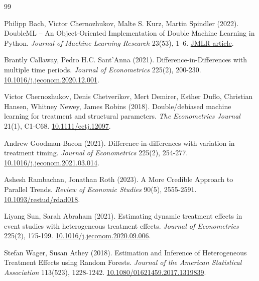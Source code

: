 \begin{thebibliography}{99}

 Philipp Bach, Victor Chernozhukov, Malte S. Kurz, Martin Spindler (2022). DoubleML – An Object-Oriented Implementation of Double Machine Learning in Python. \textit{Journal of Machine Learning Research} 23(53), 1–6. \href{https://jmlr.org/papers/v23/21-0862.html}{JMLR article}.

 Brantly Callaway, Pedro H.C. Sant’Anna (2021). Difference-in-Differences with multiple time periods. \textit{Journal of Econometrics} 225(2), 200-230. \href{https://doi.org/10.1016/j.jeconom.2020.12.001}{10.1016/j.jeconom.2020.12.001}.

 Victor Chernozhukov, Denis Chetverikov, Mert Demirer, Esther Duflo, Christian Hansen, Whitney Newey, James Robins (2018). Double/debiased machine learning for treatment and structural parameters. \textit{The Econometrics Journal} 21(1), C1-C68. \href{https://doi.org/10.1111/ectj.12097}{10.1111/ectj.12097}.

 Andrew Goodman-Bacon (2021). Difference-in-differences with variation in treatment timing. \textit{Journal of Econometrics} 225(2), 254-277. \href{https://doi.org/10.1016/j.jeconom.2021.03.014}{10.1016/j.jeconom.2021.03.014}.

 Ashesh Rambachan, Jonathan Roth (2023). A More Credible Approach to Parallel Trends. \textit{Review of Economic Studies} 90(5), 2555-2591. \href{https://doi.org/10.1093/restud/rdad018}{10.1093/restud/rdad018}.

 Liyang Sun, Sarah Abraham (2021). Estimating dynamic treatment effects in event studies with heterogeneous treatment effects. \textit{Journal of Econometrics} 225(2), 175-199. \href{https://doi.org/10.1016/j.jeconom.2020.09.006}{10.1016/j.jeconom.2020.09.006}.

 Stefan Wager, Susan Athey (2018). Estimation and Inference of Heterogeneous Treatment Effects using Random Forests. \textit{Journal of the American Statistical Association} 113(523), 1228-1242. \href{https://doi.org/10.1080/01621459.2017.1319839}{10.1080/01621459.2017.1319839}.

\end{thebibliography}
